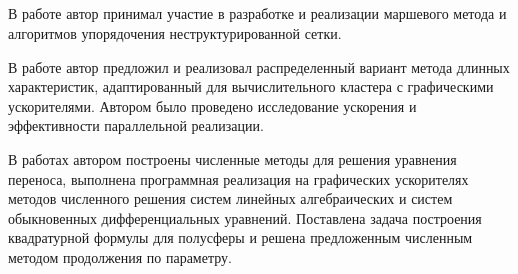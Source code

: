 \subsection*{\contribution}
В работе \cite{skalko2014} автор принимал участие в разработке и реализации маршевого метода и алгоритмов упорядочения неструктурированной сетки.

В работе \cite{tsybulin2015a} автор предложил и реализовал распределенный вариант метода длинных характеристик, адаптированный для вычислительного кластера с графическими ускорителями. Автором было проведено исследование ускорения и эффективности параллельной реализации.

В работах \cite{tsybulin2015b, miptconf55, miptconf56, miptconf57, miptconf54} автором построены численные методы для решения уравнения переноса, выполнена программная реализация на графических ускорителях методов численного решения систем линейных алгебраических и систем обыкновенных дифференциальных уравнений. Поставлена задача построения квадратурной формулы для полусферы и решена предложенным численным методом продолжения по параметру.
